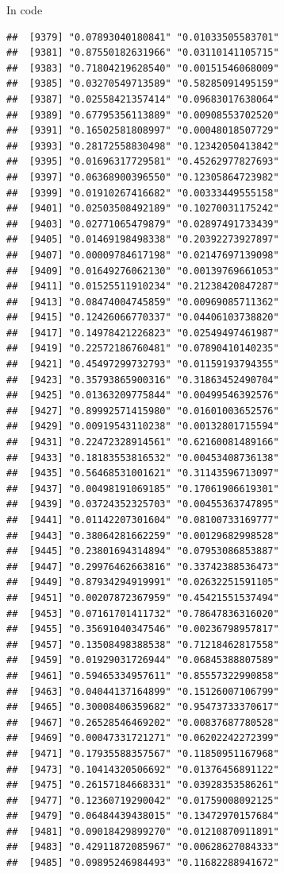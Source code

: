 \documentclass[ignorenonframetext,]{beamer}
\begin{document}
\begin{frame}[fragile]{In code}
\begin{verbatim}
##  [9379] "0.07893040180841" "0.01033505583701"
##  [9381] "0.87550182631966" "0.03110141105715"
##  [9383] "0.71804219628540" "0.00151546068009"
##  [9385] "0.03270549713589" "0.58285091495159"
##  [9387] "0.02558421357414" "0.09683017638064"
##  [9389] "0.67795356113889" "0.00908553702520"
##  [9391] "0.16502581808997" "0.00048018507729"
##  [9393] "0.28172558830498" "0.12342050413842"
##  [9395] "0.01696317729581" "0.45262977827693"
##  [9397] "0.06368900396550" "0.12305864723982"
##  [9399] "0.01910267416682" "0.00333449555158"
##  [9401] "0.02503508492189" "0.10270031175242"
##  [9403] "0.02771065479879" "0.02897491733439"
##  [9405] "0.01469198498338" "0.20392273927897"
##  [9407] "0.00009784617198" "0.02147697139098"
##  [9409] "0.01649276062130" "0.00139769661053"
##  [9411] "0.01525511910234" "0.21238420847287"
##  [9413] "0.08474004745859" "0.00969085711362"
##  [9415] "0.12426066770337" "0.04406103738820"
##  [9417] "0.14978421226823" "0.02549497461987"
##  [9419] "0.22572186760481" "0.07890410140235"
##  [9421] "0.45497299732793" "0.01159193794355"
##  [9423] "0.35793865900316" "0.31863452490704"
##  [9425] "0.01363209775844" "0.00499546392576"
##  [9427] "0.89992571415980" "0.01601003652576"
##  [9429] "0.00919543110238" "0.00132801715594"
##  [9431] "0.22472328914561" "0.62160081489166"
##  [9433] "0.18183553816532" "0.00453408736138"
##  [9435] "0.56468531001621" "0.31143596713097"
##  [9437] "0.00498191069185" "0.17061906619301"
##  [9439] "0.03724352325703" "0.00455363747895"
##  [9441] "0.01142207301604" "0.08100733169777"
##  [9443] "0.38064281662259" "0.00129682998528"
##  [9445] "0.23801694314894" "0.07953086853887"
##  [9447] "0.29976462663816" "0.33742388536473"
##  [9449] "0.87934294919991" "0.02632251591105"
##  [9451] "0.00207872367959" "0.45421551537494"
##  [9453] "0.07161701411732" "0.78647836316020"
##  [9455] "0.35691040347546" "0.00236798957817"
##  [9457] "0.13508498388538" "0.71218462817558"
##  [9459] "0.01929031726944" "0.06845388807589"
##  [9461] "0.59465334957611" "0.85557322990858"
##  [9463] "0.04044137164899" "0.15126007106799"
##  [9465] "0.30008406359682" "0.95473733370617"
##  [9467] "0.26528546469202" "0.00837687780528"
##  [9469] "0.00047331721271" "0.06202242272399"
##  [9471] "0.17935588357567" "0.11850951167968"
##  [9473] "0.10414320506692" "0.01376456891122"
##  [9475] "0.26157184668331" "0.03928353586261"
##  [9477] "0.12360719290042" "0.01759008092125"
##  [9479] "0.06484439438015" "0.13472970157684"
##  [9481] "0.09018429899270" "0.01210870911891"
##  [9483] "0.42911872085967" "0.00628627084333"
##  [9485] "0.09895246984493" "0.11682288941672"

\end{verbatim}
\end{frame}
\end{document}
